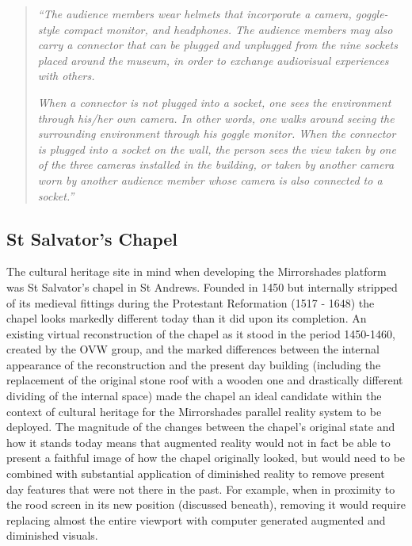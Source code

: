 \begin{quote}
	\textit{``The audience members wear helmets that incorporate a camera, goggle-style compact monitor, and headphones. The audience members may also carry a connector that can be plugged and unplugged from the nine sockets placed around the museum, in order to exchange audiovisual experiences with others.}

	\textit{When a connector is not plugged into a socket, one sees the environment through his/her own camera. In other words, one walks around seeing the surrounding environment through his goggle monitor. When the connector is plugged into a socket on the wall, the person sees the view taken by one of the three cameras installed in the building, or taken by another camera worn by another audience member whose camera is also connected to a socket.''}~\cite{Jones2006}
\end{quote}


\subsection{St Salvator's Chapel}
\label{chapel-intro}

The cultural heritage site in mind when developing the Mirrorshades platform was St Salvator's chapel in St Andrews. Founded in 1450 but internally stripped of its medieval fittings during the Protestant Reformation (1517 - 1648) the chapel looks markedly different today than it did upon its completion. An existing virtual reconstruction of the chapel as it stood in the period 1450-1460, created by the OVW group, and the marked differences between the internal appearance of the reconstruction and the present day building (including the replacement of the original stone roof with a wooden one and drastically different dividing of the internal space) made the chapel an ideal candidate within the context of cultural heritage for the Mirrorshades parallel reality system to be deployed. The magnitude of the changes between the chapel's original state and how it stands today means that augmented reality would not in fact be able to present a faithful image of how the chapel originally looked, but would need to be combined with substantial application of diminished reality to remove present day features that were not there in the past. For example, when in proximity to the rood screen in its new position (discussed beneath), removing it would require replacing almost the entire viewport with computer generated augmented and diminished visuals.


